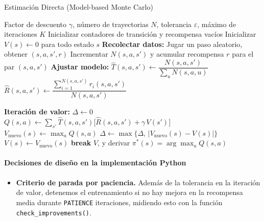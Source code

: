 \begin{algorithm}[H]
\caption{Estimación Directa (Model-based Monte Carlo)}\label{alg:direct-estimation}
\begin{algorithmic}[1]
\Require Factor de descuento $\gamma$, número de trayectorias $N$, tolerancia $\varepsilon$, máximo de iteraciones $K$
\State Inicializar contadores de transición y recompensa vacíos
\State Inicializar $V(s)\gets 0$ para todo estado $s$
  \State \textbf{Recolectar datos:}
    \State Jugar un paso aleatorio, obtener $(s,a,s',r)$
     \State Incrementar $N(s,a,s')$ y acumular recompensa $r$ para el par $(s,a,s')$
  \EndFor
  \State \textbf{Ajustar modelo:}
    \State $\hat T(s,a,s')\gets \dfrac{N(s,a,s')}{\sum_{u}N(s,a,u)}$
    \State $\hat R(s,a,s')\gets \dfrac{\sum_{i=1}^{N(s,a,s')} r_i(s,a,s')}{N(s,a,s')}$

  \EndFor
  \State \textbf{Iteración de valor:}
  \State $\Delta\gets 0$
      \State $Q(s,a)\gets \sum_{s'}\hat T(s,a,s')\bigl[\hat R(s,a,s')+\gamma\,V(s')\bigr]$
    \EndFor
    \State $V_{\text{nuevo}}(s)\gets \max_a Q(s,a)$
    \State $\Delta\gets \max\{\Delta,\,|V_{\text{nuevo}}(s)-V(s)|\}$
    \State $V(s)\gets V_{\text{nuevo}}(s)$
  \EndFor
  \If{$\Delta<\varepsilon$} \textbf{break} \EndIf
\EndFor
\State \Return $V$, y derivar $\pi^*(s)=\arg\max_a Q(s,a)$
\end{algorithmic}
\end{algorithm}

\paragraph*{Decisiones de diseño en la implementación Python}
\begin{itemize}
  \item \textbf{Criterio de parada por paciencia.} Además de la tolerancia en la iteración de valor, detenemos el entrenamiento si no hay mejora en la recompensa media durante \texttt{PATIENCE} iteraciones, midiendo esto con la función \texttt{check\_improvements()}.
\end{itemize}
\newpage